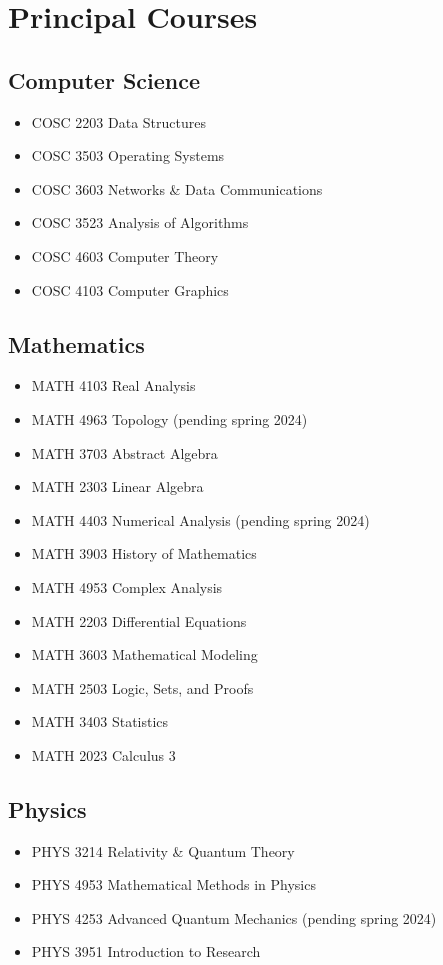 \documentclass[a4paper, 11pt]{article}
\begin{document}
    \section*{Principal Courses}\label{sec:principal_courses}
    \subsection*{Computer Science}\label{sec:cs_courses}
    \begin{itemize}
        \item COSC 2203 Data Structures
        \item COSC 3503 Operating Systems
        \item COSC 3603 Networks \& Data Communications
        \item COSC 3523 Analysis of Algorithms
        \item COSC 4603 Computer Theory
        \item COSC 4103 Computer Graphics
    \end{itemize}
    \subsection*{Mathematics}\label{sec:math_courses}
    \begin{itemize}
        \item MATH 4103 Real Analysis
        \item MATH 4963 Topology \hfill(pending spring 2024)
        \item MATH 3703 Abstract Algebra
        \item MATH 2303 Linear Algebra
        \item MATH 4403 Numerical Analysis \hfill(pending spring 2024)
        \item MATH 3903 History of Mathematics
        \item MATH 4953 Complex Analysis
        \item MATH 2203 Differential Equations
        \item MATH 3603 Mathematical Modeling
        \item MATH 2503 Logic, Sets, and Proofs
        \item MATH 3403 Statistics
        \item MATH 2023 Calculus 3
    \end{itemize}
    \subsection*{Physics}\label{sec:physics_courses}
    \begin{itemize}
        \item PHYS 3214 Relativity \& Quantum Theory
        \item PHYS 4953 Mathematical Methods in Physics
        \item PHYS 4253 Advanced Quantum Mechanics \hfill(pending spring 2024)
        \item PHYS 3951 Introduction to Research
    \end{itemize}
    
\end{document}
